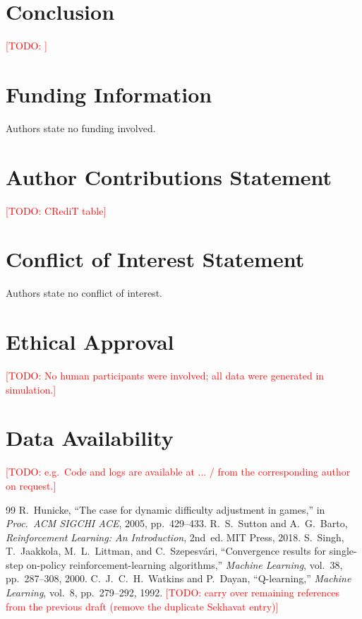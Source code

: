 \documentclass[10pt,a4paper]{article}
\newcommand{\todo}[1]{\textcolor{red}{[TODO: #1]}}
\begin{document}
\section{Conclusion}
\todo{}

\section*{Funding Information}
Authors state no funding involved.

\section*{Author Contributions Statement}
\todo{CRediT table}

\section*{Conflict of Interest Statement}
Authors state no conflict of interest.

\section*{Ethical Approval}
\todo{No human participants were involved; all data were generated in simulation.}

\section*{Data Availability}
\todo{e.g.\ Code and logs are available at ... / from the corresponding author on request.}

\begin{thebibliography}{99}
 R.~Hunicke, ``The case for dynamic difficulty adjustment in games,'' in \emph{Proc.\ ACM SIGCHI ACE}, 2005, pp.~429--433.
 R.~S.~Sutton and A.~G.~Barto, \emph{Reinforcement Learning: An Introduction}, 2nd~ed. MIT Press, 2018.
 S.~Singh, T.~Jaakkola, M.~L.~Littman, and C.~Szepesv\'ari, ``Convergence results for single-step on-policy reinforcement-learning algorithms,'' \emph{Machine Learning}, vol.~38, pp.~287--308, 2000.
 C.~J.~C.~H.~Watkins and P.~Dayan, ``Q-learning,'' \emph{Machine Learning}, vol.~8, pp.~279--292, 1992.
 \todo{carry over remaining references from the previous draft (remove the duplicate Sekhavat entry)}
\end{thebibliography}
\end{document}
